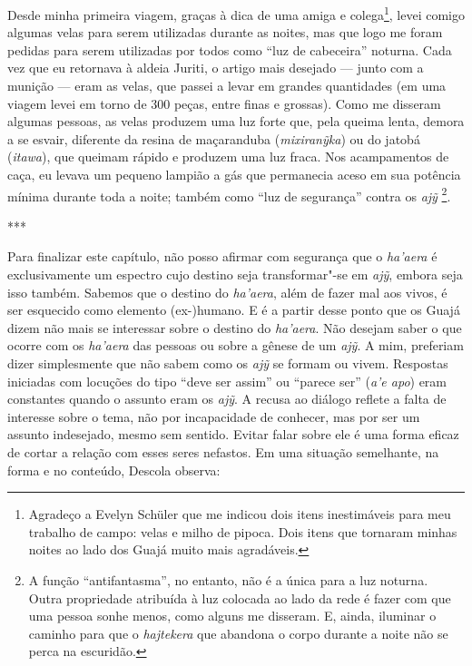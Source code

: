 Desde minha primeira viagem, graças à dica de uma amiga e
colega\footnote{Agradeço a Evelyn Schüler que me indicou dois itens
  inestimáveis para meu trabalho de campo: velas e milho de pipoca. Dois
  itens que tornaram minhas noites ao lado dos Guajá muito mais
  agradáveis.}, levei comigo algumas velas para serem utilizadas durante
as noites, mas que logo me foram pedidas para serem utilizadas por todos
como ``luz de cabeceira'' noturna. Cada vez que eu retornava à aldeia
Juriti, o artigo mais desejado --- junto com a munição --- eram as velas,
que passei a levar em grandes quantidades (em uma viagem levei em torno
de 300 peças, entre finas e grossas). Como me disseram algumas pessoas,
as velas produzem uma luz forte que, pela queima lenta, demora a se
esvair, diferente da resina de maçaranduba (\emph{mixiranỹka}) ou do
jatobá (\emph{itawa}), que queimam rápido e produzem uma luz fraca. Nos
acampamentos de caça, eu levava um pequeno lampião a gás que permanecia
aceso em sua potência mínima durante toda a noite; também como ``luz de
segurança'' contra os \emph{ajỹ} \footnote{A função ``antifantasma'', no
  entanto, não é a única para a luz noturna. Outra propriedade atribuída
  à luz colocada ao lado da rede é fazer com que uma pessoa sonhe menos,
  como alguns me disseram. E, ainda, iluminar o caminho para que o
  \emph{hajtekera} que abandona o corpo durante a noite não se perca na
  escuridão.}.

\begin{center}
***
\end{center}

Para finalizar este capítulo, não posso afirmar com segurança que o
\emph{ha'aera} é exclusivamente um espectro cujo destino seja
transformar"-se em \emph{ajỹ}, embora seja isso também. Sabemos que o
destino do \emph{ha'aera}, além de fazer mal aos vivos, é ser esquecido
como elemento (ex-)humano. E é a partir desse ponto que os Guajá dizem
não mais se interessar sobre o destino do \emph{ha'aera}. Não desejam
saber o que ocorre com os \emph{ha'aera} das pessoas ou sobre a gênese
de um \emph{ajỹ}. A mim, preferiam dizer simplesmente que não sabem como
os \emph{ajỹ} se formam ou vivem. Respostas iniciadas com locuções do
tipo ``deve ser assim'' ou ``parece ser'' (\emph{a'e apo}) eram constantes
quando o assunto eram os \emph{ajỹ}. A recusa ao diálogo reflete a falta
de interesse sobre o tema, não por incapacidade de conhecer, mas por ser
um assunto indesejado, mesmo sem sentido. Evitar falar sobre ele é uma
forma eficaz de cortar a relação com esses seres nefastos. Em uma
situação semelhante, na forma e no conteúdo, Descola observa:

